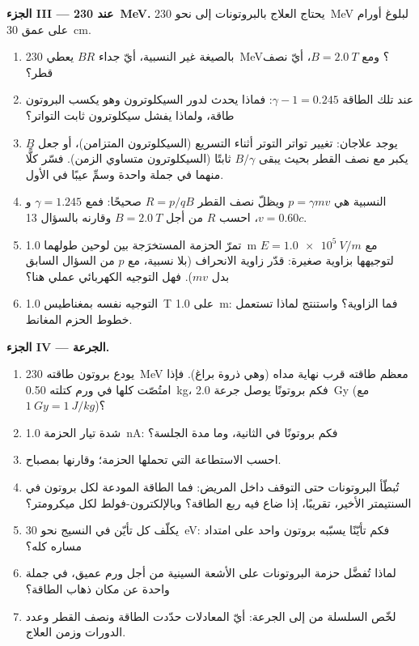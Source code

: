 \begin{problem}
\medskip
\noindent\textbf{الجزء III --- عند \qty{230}{MeV}.}
يحتاج العلاج بالبروتونات إلى نحو \qty{230}{MeV} لبلوغ أورام على عمق
\qty{30}{cm}.
\begin{enumerate}[resume]
  \item بالصيغة غير النسبية، أيّ جداء $BR$ يعطي
        \qty{230}{MeV}؟ ومع $B = \qty{2.0}{T}$، أيّ نصف قطر؟
  \item عند تلك الطاقة $\gamma - 1 = 0.245$: فماذا يحدث لدور
        السيكلوترون وهو يكسب البروتون طاقة، ولماذا يفشل
        سيكلوترون ثابت التواتر؟
  \item يوجد علاجان: تغيير تواتر التوتر أثناء
        التسريع (السيكلوترون المتزامن)، أو جعل $B$ يكبر مع نصف القطر بحيث
        يبقى $B/\gamma$ ثابتًا (السيكلوترون متساوي الزمن). فسّر
        كلًّا منهما في جملة واحدة وسمِّ عيبًا في الأول.
  \item {} النسبية هي $p = \gamma mv$ ويظلّ نصف القطر $R =
        p/qB$ صحيحًا: فمع $\gamma = 1.245$ و $v = 0.60c$، احسب
        $R$ من أجل $B = \qty{2.0}{T}$ وقارنه بالسؤال 13.
  \item تمرّ الحزمة المستخرَجة بين لوحين طولهما \qty{1.0}{m}
        مع $E = \qty{1.0e5}{V/m}$ لتوجيهها بزاوية صغيرة:
        قدّر زاوية الانحراف (بلا نسبية، مع $p$
        من السؤال السابق بدل $mv$). فهل التوجيه الكهربائي عملي هنا؟
  \item التوجيه نفسه بمغناطيس \qty{1.0}{T} على \qty{1.0}{m}:
        فما الزاوية؟ واستنتج لماذا تستعمل خطوط الحزم المغانط.
\end{enumerate}

\medskip
\noindent\textbf{الجزء IV --- الجرعة.}
\begin{enumerate}[resume]
  \item يودع بروتون طاقته \qty{230}{MeV} معظم طاقته قرب نهاية
        مداه (وهي ذروة براغ). فإذا امتُصّت كلها في
        ورم كتلته \qty{0.50}{kg}، فكم بروتونًا يوصل جرعة
        \qty{2.0}{Gy} (مع $\qty{1}{Gy} = \qty{1}{J/kg}$)؟
  \item شدة تيار الحزمة \qty{1.0}{nA}: فكم بروتونًا في الثانية، وما
        مدة الجلسة؟
  \item احسب الاستطاعة التي تحملها الحزمة؛ وقارنها بمصباح.
  \item تُبطّأ البروتونات حتى التوقف داخل المريض: فما
        الطاقة المودعة لكل بروتون في السنتيمتر الأخير، تقريبًا، إذا
        ضاع فيه ربع الطاقة؟ وبالإلكترون-فولط لكل
        ميكرومتر؟
  \item يكلّف كل تأيّن في النسيج نحو \qty{30}{eV}: فكم تأيّنًا
        يسبّبه بروتون واحد على امتداد مساره كله؟
  \item لماذا تُفضَّل حزمة البروتونات على الأشعة السينية من أجل ورم عميق، في
        جملة واحدة عن مكان ذهاب الطاقة؟
  \item لخّص السلسلة من  إلى الجرعة: أيّ
        المعادلات حدّدت الطاقة ونصف القطر وعدد الدورات
        وزمن العلاج.
\end{enumerate}
\end{problem}
